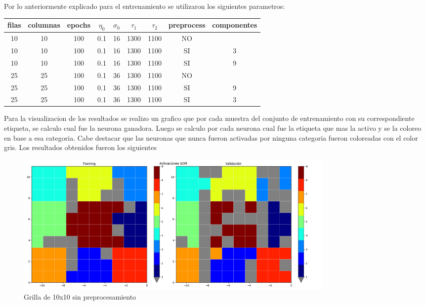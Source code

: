 Por lo anteriormente explicado para el entrenamiento se utilizaron los siguientes parametros:
\begin{center}
  \begin{tabular}{|c|c|c|c|c|c|c|c|c|}
    \hline
    filas & columnas & epochs & $\eta_0$ & $\sigma_0$ & $\tau_1$ & $\tau_2$ & preprocess & componentes \\
    \hline
	10 & 10 & 100 & 0.1 & 16 & 1300 & 1100 & NO & \ \\
    \hline
	10 & 10 & 100 & 0.1 & 16 & 1300 & 1100 & SI & 3 \\
    \hline
	10 & 10 & 100 & 0.1 & 16 & 1300 & 1100 & SI & 9 \\
    \hline
	25 & 25 & 100 & 0.1 & 36 & 1300 & 1100 & NO & \  \\
    \hline
	25 & 25 & 100 & 0.1 & 36 & 1300 & 1100 & SI & 9  \\
    \hline
  25 & 25 & 100 & 0.1 & 36 & 1300 & 1100 & SI & 3  \\
    \hline
  \end{tabular}
\end{center}

Para la visualizacion de los resultados se realizo un grafico que por cada
muestra del conjunto de entrenamiento con su correspondiente etiqueta, se
calculo cual fue la neurona ganadora. Luego se calculo por cada neurona cual
fue la etiqueta que mas la activo y se la coloreo en base a esa categoria. Cabe destacar que
las neuronas que nunca fueron activadas por ninguna categoria fueron coloreadas con el color gris.
Los resultados obtenidos fueron los siguientes

\begin{figure}[H]
  \includegraphics[width=160mm]{imagenes/som_10_10.png}
  \caption{Grilla de 10x10 sin preprocesamiento}
\end{figure}

